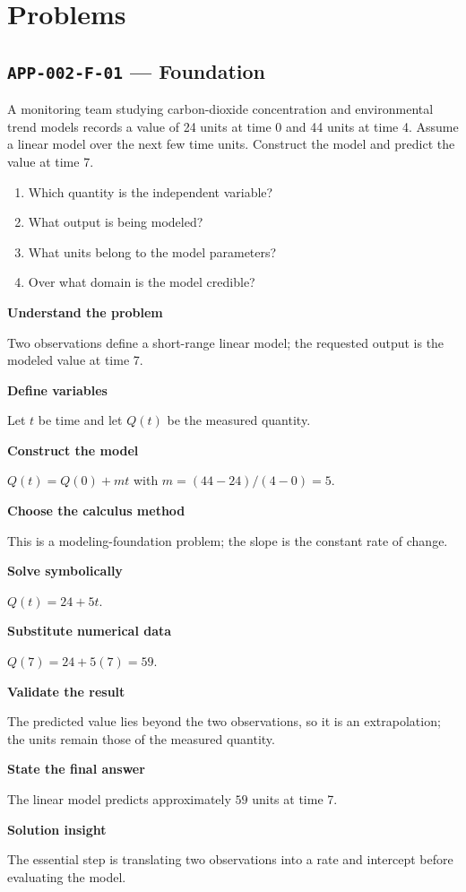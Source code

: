 \documentclass[11pt]{book}
\newcommand{\pid}[1]{\texttt{#1}}
\begin{document}
\section*{Problems}
\subsection*{\pid{APP-002-F-01} — Foundation}
\begin{problembox}
A monitoring team studying carbon-dioxide concentration and environmental trend models records a value of 24 units at time 0 and 44 units at time 4. Assume a linear model over the next few time units. Construct the model and predict the value at time 7.
\end{problembox}
\begin{promptbox}\begin{enumerate}
\item Which quantity is the independent variable?
\item What output is being modeled?
\item What units belong to the model parameters?
\item Over what domain is the model credible?
\end{enumerate}\end{promptbox}
\begin{solutionbox}
\textbf{Understand the problem}\par Two observations define a short-range linear model; the requested output is the modeled value at time 7.\par\medskip
\textbf{Define variables}\par Let $t$ be time and let $Q(t)$ be the measured quantity.\par\medskip
\textbf{Construct the model}\par $Q(t)=Q(0)+mt$ with $m=(44-24)/(4-0)=5$.\par\medskip
\textbf{Choose the calculus method}\par This is a modeling-foundation problem; the slope is the constant rate of change.\par\medskip
\textbf{Solve symbolically}\par $Q(t)=24+5t$.\par\medskip
\textbf{Substitute numerical data}\par $Q(7)=24+5(7)=59$.\par\medskip
\textbf{Validate the result}\par The predicted value lies beyond the two observations, so it is an extrapolation; the units remain those of the measured quantity.\par\medskip
\textbf{State the final answer}\par The linear model predicts approximately $59$ units at time 7.\par\medskip
\textbf{Solution insight}\par The essential step is translating two observations into a rate and intercept before evaluating the model.\par\medskip
\end{solutionbox}
\end{document}
